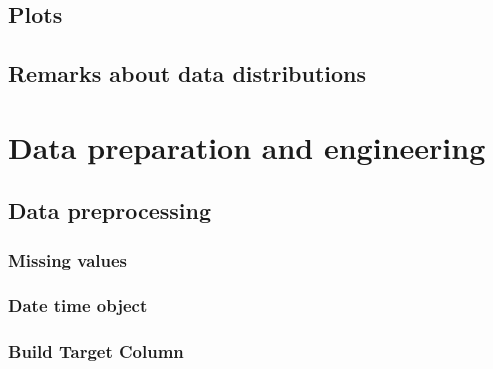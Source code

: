 \documentclass[runningheads]{llncs}
\begin{document}
    
    
    
    \subsection{Plots}
    
    
    
    \subsection{Remarks about data distributions}
        
        
        



\section{Data preparation and engineering}
    \subsection{Data preprocessing }
        \subsubsection{Missing values}
            
        \subsubsection{Date time object}    
    
        \subsubsection{Build Target Column}   
        
\end{document}
